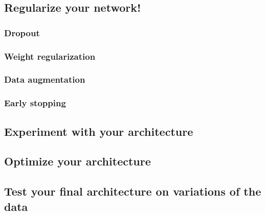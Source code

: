 \documentclass{article}
\begin{document}
\subsection{Regularize your network!}
\subsubsection{Dropout}
\subsubsection{Weight regularization}
\subsubsection{Data augmentation}
\subsubsection{Early stopping}

\subsection{Experiment with your architecture}

\subsection{Optimize your architecture}

\subsection{Test your final architecture on variations of the data}
\end{document}
